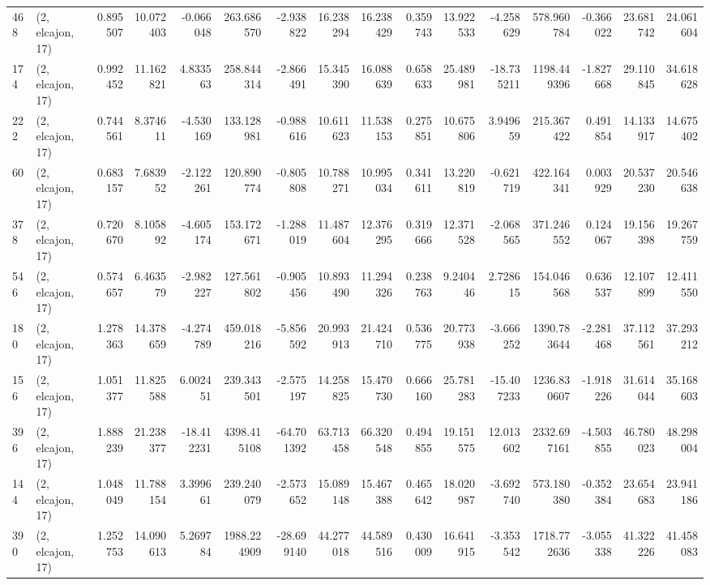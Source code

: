 \begin{tabular}{llrrrrrrrrrrrrrr}
468 &  (2, elcajon, 17) &   0.895507 &  10.072403 &  -0.066048 &   263.686570 &  -2.938822 &  16.238294 &  16.238429 &  0.359743 &  13.922533 &  -4.258629 &    578.960784 &  -0.366022 &  23.681742 &   24.061604 \\
174 &  (2, elcajon, 17) &   0.992452 &  11.162821 &   4.833563 &   258.844314 &  -2.866491 &  15.345390 &  16.088639 &  0.658633 &  25.489981 & -18.735211 &   1198.449396 &  -1.827668 &  29.110845 &   34.618628 \\
222 &  (2, elcajon, 17) &   0.744561 &   8.374611 &  -4.530169 &   133.128981 &  -0.988616 &  10.611623 &  11.538153 &  0.275851 &  10.675806 &   3.949659 &    215.367422 &   0.491854 &  14.133917 &   14.675402 \\
60  &  (2, elcajon, 17) &   0.683157 &   7.683952 &  -2.122261 &   120.890774 &  -0.805808 &  10.788271 &  10.995034 &  0.341611 &  13.220819 &  -0.621719 &    422.164341 &   0.003929 &  20.537230 &   20.546638 \\
378 &  (2, elcajon, 17) &   0.720670 &   8.105892 &  -4.605174 &   153.172671 &  -1.288019 &  11.487604 &  12.376295 &  0.319666 &  12.371528 &  -2.068565 &    371.246552 &   0.124067 &  19.156398 &   19.267759 \\
546 &  (2, elcajon, 17) &   0.574657 &   6.463579 &  -2.982227 &   127.561802 &  -0.905456 &  10.893490 &  11.294326 &  0.238763 &   9.240446 &   2.728615 &    154.046568 &   0.636537 &  12.107899 &   12.411550 \\
180 &  (2, elcajon, 17) &   1.278363 &  14.378659 &  -4.274789 &   459.018216 &  -5.856592 &  20.993913 &  21.424710 &  0.536775 &  20.773938 &  -3.666252 &   1390.783644 &  -2.281468 &  37.112561 &   37.293212 \\
156 &  (2, elcajon, 17) &   1.051377 &  11.825588 &   6.002451 &   239.343501 &  -2.575197 &  14.258825 &  15.470730 &  0.666160 &  25.781283 & -15.407233 &   1236.830607 &  -1.918226 &  31.614044 &   35.168603 \\
396 &  (2, elcajon, 17) &   1.888239 &  21.238377 & -18.412231 &  4398.415108 & -64.701392 &  63.713458 &  66.320548 &  0.494855 &  19.151575 &  12.013602 &   2332.697161 &  -4.503855 &  46.780023 &   48.298004 \\
144 &  (2, elcajon, 17) &   1.048049 &  11.788154 &   3.399661 &   239.240079 &  -2.573652 &  15.089148 &  15.467388 &  0.465642 &  18.020987 &  -3.692740 &    573.180380 &  -0.352384 &  23.654683 &   23.941186 \\
390 &  (2, elcajon, 17) &   1.252753 &  14.090613 &   5.269784 &  1988.224909 & -28.699140 &  44.277018 &  44.589516 &  0.430009 &  16.641915 &  -3.353542 &   1718.772636 &  -3.055338 &  41.322226 &   41.458083 \\

\end{tabular}
